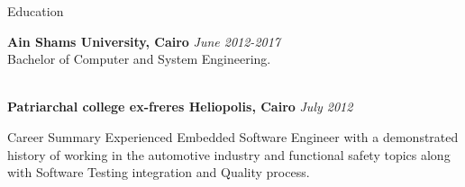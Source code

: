 \documentclass{resume} %
\begin{document}

\begin{rSection}{Education}

{\bf Ain Shams University, Cairo} \hfill {\em June 2012-2017} 
\\ Bachelor of Computer and System Engineering.

\\{\bf Patriarchal college ex-freres Heliopolis, Cairo} \hfill {\em July 2012} 
\end{rSection}
\begin{rSection}{Career Summary}
Experienced Embedded Software Engineer with a demonstrated history of working in the automotive
industry and functional safety topics along with Software Testing integration and Quality process.
\end{rSection}
\end{document}
